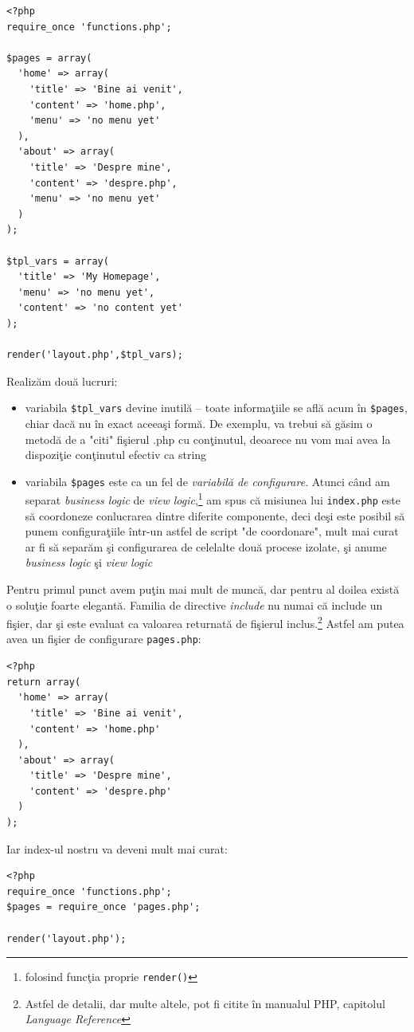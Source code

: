 \begin{lstlisting}
<?php
require_once 'functions.php';

$pages = array(
  'home' => array(
	'title' => 'Bine ai venit',
	'content' => 'home.php',
	'menu' => 'no menu yet'
  ),
  'about' => array(
	'title' => 'Despre mine',
	'content' => 'despre.php',
	'menu' => 'no menu yet'
  )
);

$tpl_vars = array(
  'title' => 'My Homepage',
  'menu' => 'no menu yet',
  'content' => 'no content yet'
);

render('layout.php',$tpl_vars);
\end{lstlisting}
Realizăm două lucruri:
\begin{itemize}
\item variabila \texttt{\$tpl\_vars} devine inutilă -- toate informaţiile se află acum în \texttt{\$pages},
chiar dacă nu în exact aceeaşi formă. De exemplu, va trebui să găsim o metodă de a "citi" fişierul .php
cu conţinutul, deoarece nu vom mai avea la dispoziţie conţinutul efectiv ca string
\item variabila \texttt{\$pages} este ca un fel de \textit{variabilă de configurare}.
Atunci când am separat \textit{business logic} de \textit{view logic},\footnote{folosind
funcţia proprie \texttt{render()}} am spus că misiunea lui \texttt{index.php} este să
coordoneze conlucrarea dintre diferite componente, deci deşi este posibil să
punem configuraţiile într-un astfel de script "de coordonare", mult mai curat ar fi
să separăm şi configurarea de celelalte două procese izolate, şi anume \textit{business logic}
şi \textit{view logic}
\end{itemize}
Pentru primul punct avem puţin mai mult de muncă, dar pentru al doilea există o soluţie
foarte elegantă. Familia de directive \textit{include} nu numai că include
un fişier, dar şi este evaluat ca valoarea returnată de fişierul inclus.\footnote{Astfel
de detalii, dar multe altele, pot fi citite în manualul PHP, capitolul
\textit{Language Reference}} Astfel
am putea avea un fişier de configurare \texttt{pages.php}:
\begin{lstlisting}[title=pages.php]
<?php
return array(
  'home' => array(
	'title' => 'Bine ai venit',
	'content' => 'home.php'
  ),
  'about' => array(
	'title' => 'Despre mine',
	'content' => 'despre.php'
  )
);
\end{lstlisting}
Iar index-ul nostru va deveni mult mai curat:
\begin{lstlisting}
<?php
require_once 'functions.php';
$pages = require_once 'pages.php';

render('layout.php');
\end{lstlisting}

